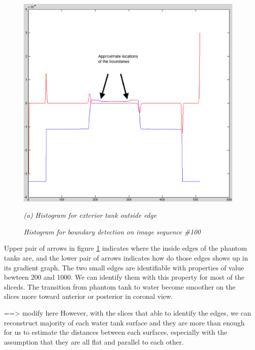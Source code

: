 \begin{figure}[htb]
  \begin{minipage}[t]{5in}
    \centering
    \centerline{\mbox{\includegraphics[width=5in]{data_extraction/images/sample/20121017_100/Coronal/exterior_outside/exterior_outside_histogram_marked.eps}}}
    \centerline{\emph{(a) Histogram for exterior tank outside edge}}
  \end{minipage}
  \caption{\emph{Histogram for boundary detection on image sequence \#100}}
  \label{fig:coronal_270_boundary_histogram}
\end{figure}

Upper pair of arrows in figure \ref{fig:coronal_270_boundary_histogram} indicates where the inside edges of
the phantom tanks are, and the lower pair of arrows indicates how do those edges shows up in its gradient graph.
The two small edges are identifiable with properties of value bewteen 200 and 1000. We can identify them with
this property for most of the sliceds. The transition from phantom tank to water become smoother on the slices
more toward anterior or posterior in coronal view. 

==> modify here
However, with the slices that able to identify the edges,
we can reconstruct majority of each water tank surface and they are more than enough for us to estimate the
distances between each surfaces, especially with the assumption that they are all flat and parallel to each
other.

